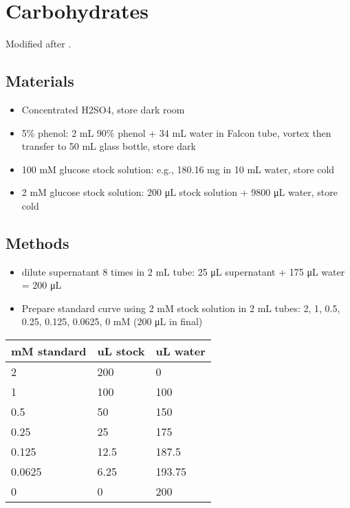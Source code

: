 \documentclass[
]{book}
\providecommand{\tightlist}{%
  \setlength{\itemsep}{0pt}\setlength{\parskip}{0pt}}
\begin{document}
\hypertarget{carbs}{%
\chapter{Carbohydrates}\label{carbs}}

Modified after \textcite{masuko2005}.

\hypertarget{materials-3}{%
\section{Materials}\label{materials-3}}

\begin{itemize}
\tightlist
\item
  Concentrated H2SO4, store dark room
\item
  5\% phenol: 2 mL 90\% phenol + 34 mL water in Falcon tube, vortex then transfer to 50 mL glass bottle, store dark
\item
  100 mM glucose stock solution: e.g., 180.16 mg in 10 mL water, store cold
\item
  2 mM glucose stock solution: 200 μL stock solution + 9800 μL water, store cold
\end{itemize}

\hypertarget{methods-3}{%
\section{Methods}\label{methods-3}}

\begin{itemize}
\tightlist
\item
  dilute supernatant 8 times in 2 mL tube: 25 μL supernatant + 175 μL water = 200 μL
\item
  Prepare standard curve using 2 mM stock solution in 2 mL tubes: 2, 1, 0.5, 0.25, 0.125, 0.0625, 0 mM (200 μL in final)
\end{itemize}

\begin{longtable}[]{@{}lll@{}}
\toprule()
mM standard & uL stock & uL water \\
\midrule()
\endhead
2 & 200 & 0 \\
1 & 100 & 100 \\
0.5 & 50 & 150 \\
0.25 & 25 & 175 \\
0.125 & 12.5 & 187.5 \\
0.0625 & 6.25 & 193.75 \\
0 & 0 & 200 \\
\bottomrule()
\end{longtable}
\end{document}
